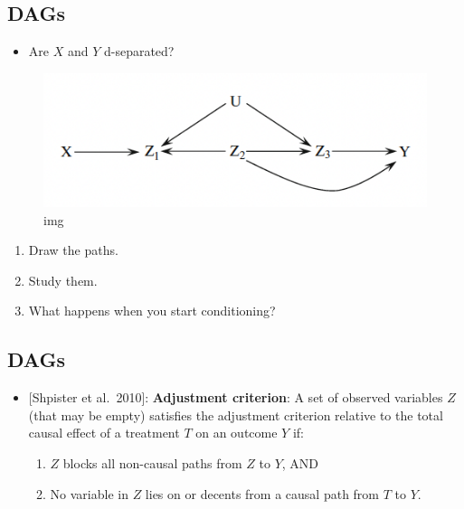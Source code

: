 \documentclass[11pt]{article}
\providecommand{\tightlist}{%
      \setlength{\itemsep}{0pt}\setlength{\parskip}{0pt}}
\begin{document}
    \hypertarget{dags}{%
\subsection{DAGs}\label{dags}}

\begin{itemize}
\tightlist
\item
  Are \(X\) and \(Y\) d-separated?
\end{itemize}

\begin{figure}
\centering
\includegraphics{../img/dag3.png}
\caption{img}
\end{figure}

\begin{enumerate}
\def\labelenumi{\arabic{enumi}.}
\tightlist
\item
  Draw the paths.
\item
  Study them.
\item
  What happens when you start conditioning?
\end{enumerate}

    \hypertarget{dags}{%
\subsection{DAGs}\label{dags}}

\begin{itemize}
\tightlist
\item
  {[}Shpister et al.~2010{]}: \textbf{Adjustment criterion}: A set of
  observed variables \(Z\) (that may be empty) satisfies the adjustment
  criterion relative to the total causal effect of a treatment \(T\) on
  an outcome \(Y\) if:

  \begin{enumerate}
  \def\labelenumi{\arabic{enumi}.}
  \tightlist
  \item
    \(Z\) blocks all non-causal paths from \(Z\) to \(Y\), AND
  \item
    No variable in \(Z\) lies on or decents from a causal path from
    \(T\) to \(Y\).
  \end{enumerate}
\end{itemize}
\end{document}

